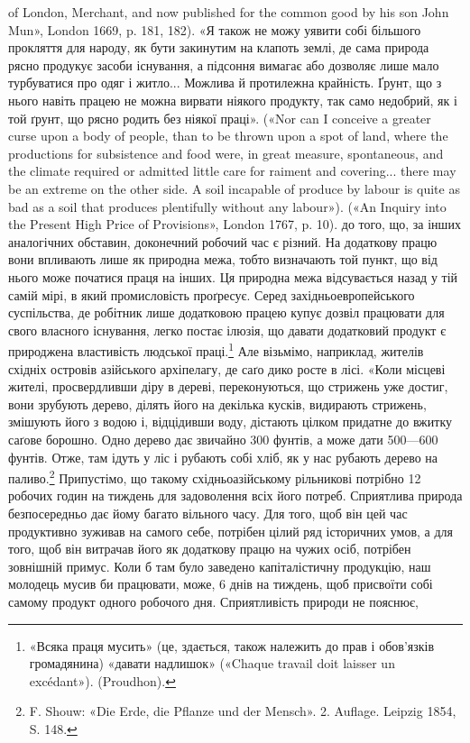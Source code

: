 of London, Merchant, and now published for the common good by his son
John Mun», London 1669, p. 181, 182). «Я також не можу уявити собі
більшого прокляття для народу, як бути закинутим на клапоть землі,
де сама природа рясно продукує засоби існування, а підсоння вимагає
або дозволяє лише мало турбуватися про одяг і житло... Можлива й протилежна
крайність. Ґрунт, що з нього навіть працею не можна вирвати
ніякого продукту, так само недобрий, як і той ґрунт, що рясно родить
без ніякої праці». («Nor can I conceive a greater curse upon a body of people,
than to be thrown upon a spot of land, where the productions for subsistence
and food were, in great measure, spontaneous, and the climate required
or admitted little care for raiment and covering... there may be an extreme
on the other side. A soil incapable of produce by labour is quite as bad as
a soil that produces plentifully without any labour»). («An Inquiry into
the Present High Price of Provisions», London 1767, p. 10).
до того, що, за інших аналогічних обставин, доконечний робочий
час є різний. На додаткову працю вони впливають лише як
природна межа, тобто визначають той пункт, що від нього може
початися праця на інших. Ця природна межа відсувається назад
у тій самій мірі, в який промисловість проґресує. Серед західньоевропейського
суспільства, де робітник лише додатковою працею
купує дозвіл працювати для свого власного існування, легко
постає ілюзія, що давати додатковий продукт є природжена властивість
людської праці.\footnote{
«Всяка праця мусить» (це, здається, також належить до прав і
обов’язків громадянина) «давати надлишок» («Chaque travail doit
laisser un excédant»). (Proudhon).
} Але візьмімо, наприклад, жителів
східніх островів азійського архіпелагу, де саґо дико росте в лісі.
«Коли місцеві жителі, просвердливши діру в дереві, переконуються,
що стрижень уже достиг, вони зрубують дерево, ділять
його на декілька кусків, видирають стрижень, змішують його
з водою і, відцідивши воду, дістають цілком придатне до вжитку
саґове борошно. Одно дерево дає звичайно 300 фунтів, а може
дати 500—600 фунтів. Отже, там ідуть у ліс і рубають собі хліб,
як у нас рубають дерево на паливо.\footnote{
F. Shouw: «Die Erde, die Pflanze und der Mensch». 2. Auflage. Leipzig
1854, S. 148.
} Припустімо, що такому
східньоазійському рільникові потрібно 12 робочих годин на
тиждень для задоволення всіх його потреб. Сприятлива природа
безпосередньо дає йому багато вільного часу. Для того, щоб він
цей час продуктивно зуживав на самого себе, потрібен цілий ряд
історичних умов, а для того, щоб він витрачав його як додаткову
працю на чужих осіб, потрібен зовнішній примус. Коли б там
було заведено капіталістичну продукцію, наш молодець мусив би
працювати, може, 6 днів на тиждень, щоб присвоїти собі самому
продукт одного робочого дня. Сприятливість природи не пояснює,

